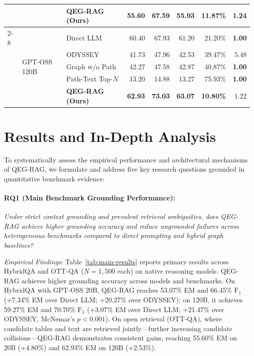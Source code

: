 \documentclass[runningheads]{llncs}
\begin{document}
\begin{table}[t]
{\begin{tabular}{@{}lllrrrrr@{}}
& & \textbf{QEG-RAG (Ours)}  & \textbf{55.60} & \textbf{67.59} & \textbf{55.93} & \textbf{11.87\%} & 1.24 \\
\cmidrule{2-8}
& \multirow{5}{*}{GPT-OSS 120B} 
  & Direct LLM               & 60.40 & 67.93 & 61.20 & 21.20\% & \textbf{1.00} \\
& & ODYSSEY~\cite{agarwal2025hybrid} & 41.73 & 47.96 & 42.53 & 39.47\% & 5.48 \\
& & Graph w/o Path           & 42.27 & 47.58 & 42.87 & 40.87\% & \textbf{1.00} \\
& & Path-Text Top-$N$        & 13.20 & 14.88 & 13.27 & 75.93\% & \textbf{1.00} \\
& & \textbf{QEG-RAG (Ours)}  & \textbf{62.93} & \textbf{73.03} & \textbf{63.07} & \textbf{10.80\%} & 1.22 \\
\bottomrule
\end{tabular}%
}
\vspace{-2.5mm}
\end{table}

\section{Results and In-Depth Analysis}
\label{sec:results}
To systematically assess the empirical performance and architectural mechanisms of QEG-RAG, we formulate and address five key research questions grounded in quantitative benchmark evidence:

\paragraph{RQ1 (Main Benchmark Grounding Performance):}
\emph{Under strict context grounding and prevalent retrieval ambiguities, does QEG-RAG achieve higher grounding accuracy and reduce ungrounded failures across heterogeneous benchmarks compared to direct prompting and hybrid graph baselines?}

\emph{Empirical Findings}: Table~\ref{tab:main-results} reports primary results across HybridQA and OTT-QA ($N=1{,}500$ each) on native reasoning models. QEG-RAG achieves higher grounding accuracy across models and benchmarks. On HybridQA with GPT-OSS 20B, QEG-RAG reaches 53.07\% EM and 66.45\% $\text{F}_1$ (+7.34\% EM over Direct LLM; +20.27\% over ODYSSEY); on 120B, it achieves 59.27\% EM and 70.70\% $\text{F}_1$ (+3.07\% EM over Direct LLM; +21.47\% over ODYSSEY, McNemar's $p < 0.001$). On open retrieval (OTT-QA), where candidate tables and text are retrieved jointly---further increasing candidate collisions---QEG-RAG demonstrates consistent gains, reaching 55.60\% EM on 20B (+4.80\%) and 62.93\% EM on 120B (+2.53\%).
\end{document}
